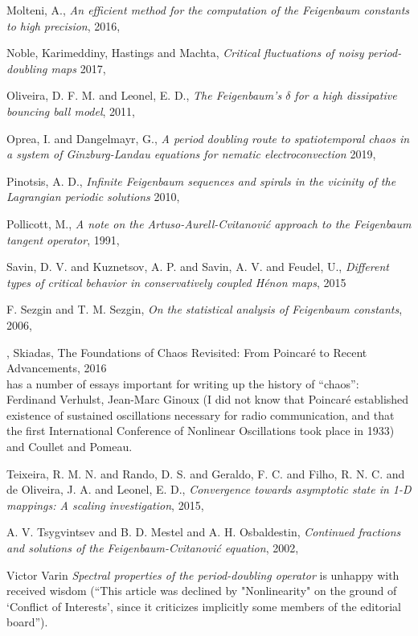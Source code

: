 \begin{description}
{Molteni, A.},
{\em An efficient method for the computation of the {Feigenbaum} constants to high precision},
{2016},

Noble, Karimeddiny, Hastings and Machta,
{\em Critical fluctuations of noisy period-doubling maps}
{2017},

{Oliveira, D. F. M. and Leonel, E. D.},
{\em The {Feigenbaum}'s {$\delta$} for a high dissipative bouncing ball model},
{2011},

{Oprea, I. and Dangelmayr, G.},
{\em A period doubling route to spatiotemporal chaos in a system of
{Ginzburg-Landau} equations for nematic electroconvection}
{2019},

{Pinotsis, A. D.},
{\em Infinite {Feigenbaum} sequences and spirals in the vicinity of the
{Lagrangian} periodic solutions}
{2010},

{Pollicott, M.},
{\em A note on the {Artuso-Aurell-Cvitanovi{\'c}} approach to the {Feigenbaum} tangent operator},
{1991},

{Savin, D. V. and Kuznetsov, A. P. and Savin, A. V. and Feudel, U.},
{\em Different types of critical behavior in conservatively coupled {H{\'{e}}non} maps},
{2015}

{F. Sezgin and T. M. Sezgin},
{\em On the statistical analysis of {Feigenbaum} constants},
{2006},

,
{Skiadas},
{{The Foundations of Chaos Revisited: From Poincar{\'{e}} to Recent Advancements}},
{2016}
\\
has a number of essays important for writing up the history of ``chaos'':
Ferdinand Verhulst, Jean-Marc Ginoux (I did not know that Poincar\'e
established existence of sustained oscillations necessary for radio
communication, and that the first International Conference of Nonlinear
Oscillations took place in 1933) and
Coullet and Pomeau.

{Teixeira, R. M. N. and Rando, D. S. and Geraldo, F. C. and Filho, R. N. C. and de Oliveira, J. A. and Leonel, E. D.},
{\em Convergence towards asymptotic state in {1-D} mappings: {A} scaling investigation},
{2015},

{A. V. Tsygvintsev and B. D. Mestel and A. H. Osbaldestin},
{\em Continued fractions and solutions of the {Feigenbaum-Cvitanovi{\'{c}}} equation},
{2002},

Victor Varin {\em Spectral properties of the period-doubling operator}
 is unhappy with received wisdom (``This article was
declined by "Nonlinearity" on the ground of `Conflict of Interests',
since it criticizes implicitly some members of the editorial board'').


\end{description}
